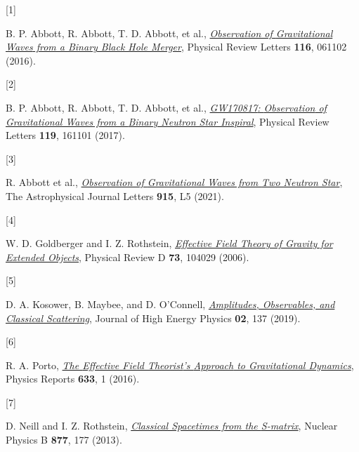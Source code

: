 \documentclass[
  11pt,
  a4paper,
  DIV=11,
  numbers=noendperiod,
  twoside]{scrreprt}
\newlength{\cslhangindent}
\newlength{\csllabelwidth}
\newlength{\cslentryspacingunit} %
\newenvironment{CSLReferences}[2] %
 {%
  \setlength{\parindent}{0pt}
  \ifodd #1
  \let\oldpar\par
  \def\par{\hangindent=\cslhangindent\oldpar}
  \fi
  \setlength{\parskip}{#2\cslentryspacingunit}
 }%
 {}
\newcommand{\CSLLeftMargin}[1]{\parbox[t]{\csllabelwidth}{#1}}
\newcommand{\CSLRightInline}[1]{\parbox[t]{\linewidth - \csllabelwidth}{#1}\break}
\DeclareRobustCommand{\[}{\begin{equation}}
\DeclareRobustCommand{\]}{\end{equation}}
\begin{document}
\hypertarget{refs}{}
\begin{CSLReferences}{0}{0}
\begin{figure}

\end{figure}

\leavevmode{}%
\CSLLeftMargin{{[}1{]} }%
\CSLRightInline{B. P. Abbott, R. Abbott, T. D. Abbott, et al.,
\emph{\href{https://doi.org/10.1103/PhysRevLett.116.061102}{Observation
of {Gravitational Waves} from a {Binary Black Hole Merger}}}, Physical
Review Letters \textbf{116}, 061102 (2016).}

\leavevmode{}%
\CSLLeftMargin{{[}2{]} }%
\CSLRightInline{B. P. Abbott, R. Abbott, T. D. Abbott, et al.,
\emph{\href{https://doi.org/10.1103/PhysRevLett.119.161101}{{GW170817}:
{Observation} of {Gravitational Waves} from a {Binary Neutron Star
Inspiral}}}, Physical Review Letters \textbf{119}, 161101 (2017).}

\leavevmode{}%
\CSLLeftMargin{{[}3{]} }%
\CSLRightInline{R. Abbott et al.,
\emph{\href{https://doi.org/10.3847/2041-8213/ac082e}{Observation of
{Gravitational Waves} from {Two Neutron
Star}\textendash{{Black Hole Coalescences}}}}, The Astrophysical Journal
Letters \textbf{915}, L5 (2021).}

\leavevmode{}%
\CSLLeftMargin{{[}4{]} }%
\CSLRightInline{W. D. Goldberger and I. Z. Rothstein,
\emph{\href{https://doi.org/10.1103/PhysRevD.73.104029}{Effective Field
Theory of Gravity for Extended Objects}}, Physical Review D \textbf{73},
104029 (2006).}

\leavevmode{}%
\CSLLeftMargin{{[}5{]} }%
\CSLRightInline{D. A. Kosower, B. Maybee, and D. O'Connell,
\emph{\href{https://doi.org/10.1007/JHEP02(2019)137}{Amplitudes,
Observables, and Classical Scattering}}, Journal of High Energy Physics
\textbf{02}, 137 (2019).}

\leavevmode{}%
\CSLLeftMargin{{[}6{]} }%
\CSLRightInline{R. A. Porto,
\emph{\href{https://doi.org/10.1016/j.physrep.2016.04.003}{The
{Effective Field Theorist}'s {Approach} to {Gravitational Dynamics}}},
Physics Reports \textbf{633}, 1 (2016).}

\leavevmode{}%
\CSLLeftMargin{{[}7{]} }%
\CSLRightInline{D. Neill and I. Z. Rothstein,
\emph{\href{https://doi.org/10.1016/j.nuclphysb.2013.09.007}{Classical
Space\textendash times from the {S-matrix}}}, Nuclear Physics B
\textbf{877}, 177 (2013).}


\end{CSLReferences}
\end{document}
